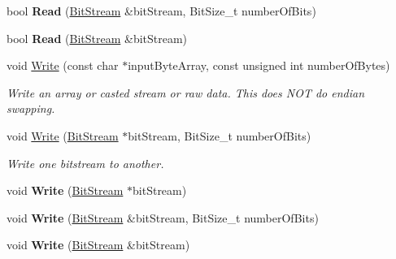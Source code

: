 \begin{DoxyCompactItemize}
\item 
\hypertarget{class_rak_net_1_1_bit_stream_a6200e87bf2633a06fba167de50dc8a39}{bool {\bfseries Read} (\hyperlink{class_rak_net_1_1_bit_stream}{Bit\-Stream} \&bit\-Stream, Bit\-Size\-\_\-t number\-Of\-Bits)}\label{class_rak_net_1_1_bit_stream_a6200e87bf2633a06fba167de50dc8a39}

\item 
\hypertarget{class_rak_net_1_1_bit_stream_ad4f6c69ecceed0c33c116bcad2cbebdc}{bool {\bfseries Read} (\hyperlink{class_rak_net_1_1_bit_stream}{Bit\-Stream} \&bit\-Stream)}\label{class_rak_net_1_1_bit_stream_ad4f6c69ecceed0c33c116bcad2cbebdc}

\item 
void \hyperlink{class_rak_net_1_1_bit_stream_a0c6e2624a5960f9ac40d4072a6e607e5}{Write} (const char $\ast$input\-Byte\-Array, const unsigned int number\-Of\-Bytes)
\begin{DoxyCompactList}\small\item\em Write an array or casted stream or raw data. This does N\-O\-T do endian swapping. \end{DoxyCompactList}\item 
void \hyperlink{class_rak_net_1_1_bit_stream_a26624b5669df1c38f6dd6dabf4c1b769}{Write} (\hyperlink{class_rak_net_1_1_bit_stream}{Bit\-Stream} $\ast$bit\-Stream, Bit\-Size\-\_\-t number\-Of\-Bits)
\begin{DoxyCompactList}\small\item\em Write one bitstream to another. \end{DoxyCompactList}\item 
\hypertarget{class_rak_net_1_1_bit_stream_a04220acc1cda538ff7650ec4be904011}{void {\bfseries Write} (\hyperlink{class_rak_net_1_1_bit_stream}{Bit\-Stream} $\ast$bit\-Stream)}\label{class_rak_net_1_1_bit_stream_a04220acc1cda538ff7650ec4be904011}

\item 
\hypertarget{class_rak_net_1_1_bit_stream_a32779bdac22c375c7ccb91ff245290e9}{void {\bfseries Write} (\hyperlink{class_rak_net_1_1_bit_stream}{Bit\-Stream} \&bit\-Stream, Bit\-Size\-\_\-t number\-Of\-Bits)}\label{class_rak_net_1_1_bit_stream_a32779bdac22c375c7ccb91ff245290e9}

\item 
\hypertarget{class_rak_net_1_1_bit_stream_a539e9ea6d4942317c7ecd9697c5b963c}{void {\bfseries Write} (\hyperlink{class_rak_net_1_1_bit_stream}{Bit\-Stream} \&bit\-Stream)}\label{class_rak_net_1_1_bit_stream_a539e9ea6d4942317c7ecd9697c5b963c}


\end{DoxyCompactItemize}
